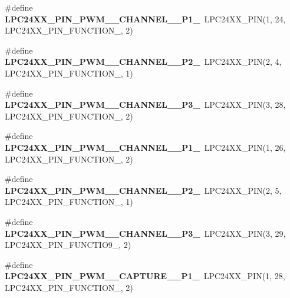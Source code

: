 \begin{DoxyCompactItemize}
\#define {\bfseries L\+P\+C24\+X\+X\+\_\+\+P\+I\+N\+\_\+\+P\+W\+M\+\_\+\_\+\+C\+H\+A\+N\+N\+E\+L\+\_\+\_\+\+P1\+\_}~L\+P\+C24\+X\+X\+\_\+\+P\+IN(1, 24, L\+P\+C24\+X\+X\+\_\+\+P\+I\+N\+\_\+\+F\+U\+N\+C\+T\+I\+O\+N\+\_, 2)
\item 
\mbox{\label{group__lpc24xx__io_ga503ab699ac2f7161a08a1996e0b06afe}} 
\#define {\bfseries L\+P\+C24\+X\+X\+\_\+\+P\+I\+N\+\_\+\+P\+W\+M\+\_\+\_\+\+C\+H\+A\+N\+N\+E\+L\+\_\+\_\+\+P2\+\_}~L\+P\+C24\+X\+X\+\_\+\+P\+IN(2, 4, L\+P\+C24\+X\+X\+\_\+\+P\+I\+N\+\_\+\+F\+U\+N\+C\+T\+I\+O\+N\+\_, 1)
\item 
\mbox{\label{group__lpc24xx__io_gac9728e93f26b17ba8847926c4adefaf6}} 
\#define {\bfseries L\+P\+C24\+X\+X\+\_\+\+P\+I\+N\+\_\+\+P\+W\+M\+\_\+\_\+\+C\+H\+A\+N\+N\+E\+L\+\_\+\_\+\+P3\+\_}~L\+P\+C24\+X\+X\+\_\+\+P\+IN(3, 28, L\+P\+C24\+X\+X\+\_\+\+P\+I\+N\+\_\+\+F\+U\+N\+C\+T\+I\+O\+N\+\_, 2)
\item 
\mbox{\label{group__lpc24xx__io_ga63ec5b8ac8b4f1a93d7c8f9831b2149f}} 
\#define {\bfseries L\+P\+C24\+X\+X\+\_\+\+P\+I\+N\+\_\+\+P\+W\+M\+\_\+\_\+\+C\+H\+A\+N\+N\+E\+L\+\_\+\_\+\+P1\+\_}~L\+P\+C24\+X\+X\+\_\+\+P\+IN(1, 26, L\+P\+C24\+X\+X\+\_\+\+P\+I\+N\+\_\+\+F\+U\+N\+C\+T\+I\+O\+N\+\_, 2)
\item 
\mbox{\label{group__lpc24xx__io_gab2238c139e7ea808e9a49430293f4846}} 
\#define {\bfseries L\+P\+C24\+X\+X\+\_\+\+P\+I\+N\+\_\+\+P\+W\+M\+\_\+\_\+\+C\+H\+A\+N\+N\+E\+L\+\_\+\_\+\+P2\+\_}~L\+P\+C24\+X\+X\+\_\+\+P\+IN(2, 5, L\+P\+C24\+X\+X\+\_\+\+P\+I\+N\+\_\+\+F\+U\+N\+C\+T\+I\+O\+N\+\_, 1)
\item 
\mbox{\label{group__lpc24xx__io_ga5689207019e92804e397ef8599e5c0ca}} 
\#define {\bfseries L\+P\+C24\+X\+X\+\_\+\+P\+I\+N\+\_\+\+P\+W\+M\+\_\+\_\+\+C\+H\+A\+N\+N\+E\+L\+\_\+\_\+\+P3\+\_}~L\+P\+C24\+X\+X\+\_\+\+P\+IN(3, 29, L\+P\+C24\+X\+X\+\_\+\+P\+I\+N\+\_\+\+F\+U\+N\+C\+T\+I\+O9\+\_, 2)
\item 
\mbox{\label{group__lpc24xx__io_ga809e9809bfdae0b54b0dd1bb8a159103}} 
\#define {\bfseries L\+P\+C24\+X\+X\+\_\+\+P\+I\+N\+\_\+\+P\+W\+M\+\_\+\_\+\+C\+A\+P\+T\+U\+R\+E\+\_\+\_\+\+P1\+\_}~L\+P\+C24\+X\+X\+\_\+\+P\+IN(1, 28, L\+P\+C24\+X\+X\+\_\+\+P\+I\+N\+\_\+\+F\+U\+N\+C\+T\+I\+O\+N\+\_, 2)

\end{DoxyCompactItemize}
